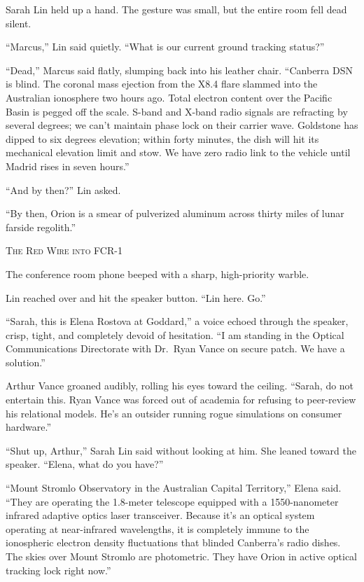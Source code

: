 \documentclass[12pt,twoside,openright]{book}
\newcommand{\sceneheader}[1]{%
  \par\vspace{1.8em}%
  {\noindent\centering\scshape\large #1\par}%
  \vspace{1.0em}%
  \noindent%
}
\newcommand{\dinkus}{%
  \par\vspace{1.2em}%
  {\noindent\centering{\large $\ast\quad\ast\quad\ast$}\par}%
  \vspace{1.2em}%
  \noindent%
}
\begin{document}
Sarah Lin held up a hand. The gesture was small, but the entire room
fell dead silent.

``Marcus,'' Lin said quietly. ``What is our current ground tracking
status?''

``Dead,'' Marcus said flatly, slumping back into his leather chair.
``Canberra DSN is blind. The coronal mass ejection from the X8.4 flare
slammed into the Australian ionosphere two hours ago. Total electron
content over the Pacific Basin is pegged off the scale. S-band and
X-band radio signals are refracting by several degrees; we can't
maintain phase lock on their carrier wave. Goldstone has dipped to six
degrees elevation; within forty minutes, the dish will hit its
mechanical elevation limit and stow. We have zero radio link to the
vehicle until Madrid rises in seven hours.''

``And by then?'' Lin asked.

``By then, Orion is a smear of pulverized aluminum across thirty miles
of lunar farside regolith.''

\dinkus

\sceneheader{The Red Wire into FCR-1}

The conference room phone beeped with a sharp, high-priority warble.

Lin reached over and hit the speaker button. ``Lin here. Go.''

``Sarah, this is Elena Rostova at Goddard,'' a voice echoed through the
speaker, crisp, tight, and completely devoid of hesitation. ``I am
standing in the Optical Communications Directorate with Dr.~Ryan Vance
on secure patch. We have a solution.''

Arthur Vance groaned audibly, rolling his eyes toward the ceiling.
``Sarah, do not entertain this. Ryan Vance was forced out of academia
for refusing to peer-review his relational models. He's an outsider
running rogue simulations on consumer hardware.''

``Shut up, Arthur,'' Sarah Lin said without looking at him. She leaned
toward the speaker. ``Elena, what do you have?''

``Mount Stromlo Observatory in the Australian Capital Territory,'' Elena
said. ``They are operating the 1.8-meter telescope equipped with a
1550-nanometer infrared adaptive optics laser transceiver. Because it's
an optical system operating at near-infrared wavelengths, it is
completely immune to the ionospheric electron density fluctuations that
blinded Canberra's radio dishes. The skies over Mount Stromlo are
photometric. They have Orion in active optical tracking lock right
now.''
\end{document}
